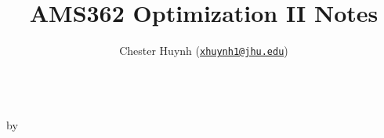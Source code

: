 \documentclass[11pt]{article}
\title{AMS362 Optimization II Notes}
\author{%
    Chester Huynh (\href{mailto:xhuynh1@jhu.edu}{\texttt{xhuynh1@jhu.edu}})
}
\begin{document}
\makeatletter
\begin{center}
  {\LARGE\bf \@title} \\ \vspace*{0.5cm}
  by \@author
\end{center}
\makeatother

\tableofcontents

\clearpage

\end{document}
